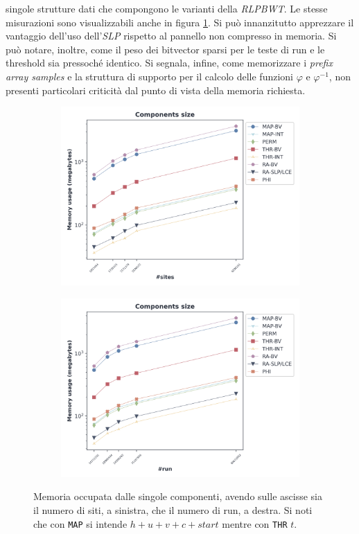 singole strutture dati che compongono le varianti della \textit{RLPBWT}. Le
stesse misurazioni sono visualizzabili anche in figura \ref{fig:comp}. Si può
innanzitutto apprezzare il vantaggio dell'uso dell'\textit{SLP} rispetto al
pannello non compresso in memoria. Si può notare, inoltre, come il peso dei
bitvector sparsi per le teste di run e le threshold sia pressoché identico. Si
segnala, infine, come memorizzare i \textit{prefix array samples} e la struttura
di supporto per il calcolo delle funzioni $\varphi$ e $\varphi^{-1}$, non
presenti particolari criticità dal punto di vista della memoria richiesta.
\begin{figure}
  \centering
  \begin{subfigure}{.5\textwidth}
    \centering
    \includegraphics[width=\linewidth]{img/comp_sites.png}
  \end{subfigure}%
  \begin{subfigure}{.5\textwidth}
    \centering
    \includegraphics[width=\linewidth]{img/comp_runs.png}
  \end{subfigure}
  \caption{Memoria occupata dalle singole componenti, avendo sulle ascisse sia
    il numero di siti, a sinistra, che il numero di run, a destra. Si noti che
    con \texttt{MAP} si intende $h+u+v+c+start$ mentre con \texttt{THR} $t$. }
  \label{fig:comp}
\end{figure}
